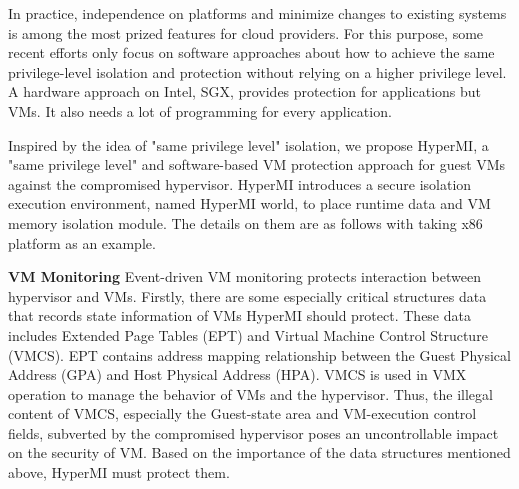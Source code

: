 \documentclass[conference]{IEEEtran}
\begin{document}
In practice, independence on platforms and minimize changes to existing systems is among the most prized features for cloud providers. For this purpose,
some recent efforts only focus on software approaches about how to achieve the same privilege-level isolation and protection without relying on a higher privilege level. 
 A hardware approach on Intel, SGX, provides protection for applications but VMs. It also needs a lot of programming for every application.



Inspired by the idea of "same privilege level" isolation, we propose HyperMI, a "same privilege level" and software-based VM protection approach for guest VMs against the compromised hypervisor. HyperMI introduces a secure isolation execution environment, named HyperMI world, to place runtime data and VM memory isolation module. 
The details on them are as follows with taking x86 platform as an example.

\textbf{VM Monitoring}
Event-driven VM monitoring protects interaction between hypervisor and VMs. 
Firstly, there are some especially critical structures data that records state information of VMs HyperMI should protect. These data includes Extended Page Tables (EPT) and Virtual Machine Control Structure (VMCS). EPT contains address mapping relationship between the Guest Physical Address (GPA) and Host Physical Address (HPA). 
VMCS is used in VMX operation to manage the behavior of VMs and the hypervisor. Thus, the illegal content of VMCS, especially the Guest-state area and VM-execution control fields, subverted by the compromised hypervisor poses an uncontrollable impact on the security of VM. 
Based on the importance of the data structures mentioned above, HyperMI must protect them. 
\end{document}
